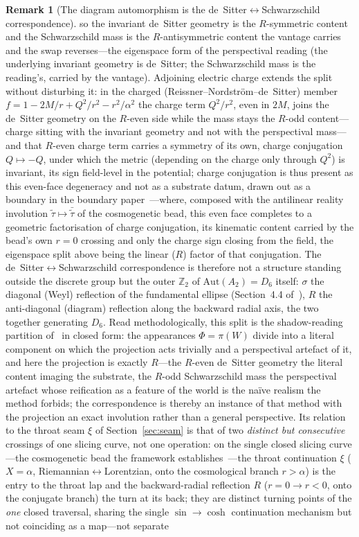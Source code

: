 \documentclass[11pt,a4paper]{article}
\theoremstyle{definition}
\newtheorem{remark}[theorem]{Remark}
\begin{document}
\begin{remark}[The diagram automorphism is the de~Sitter$\leftrightarrow$Schwarzschild correspondence]
so the invariant de~Sitter geometry is the $R$-symmetric content and the Schwarzschild mass is the $R$-antisymmetric content the vantage carries and the swap reverses---the eigenspace form of the perspectival reading (the underlying invariant geometry is de~Sitter; the Schwarzschild mass is the reading's, carried by the vantage). Adjoining electric charge extends the split without disturbing it: in the charged (Reissner--Nordstr\"om--de~Sitter) member $f=1-2M/r+Q^{2}/r^{2}-r^{2}/\alpha^{2}$ the charge term $Q^{2}/r^{2}$, even in $2M$, joins the de~Sitter geometry on the $R$-even side while the mass stays the $R$-odd content---charge sitting with the invariant geometry and not with the perspectival mass---and that $R$-even charge term carries a symmetry of its own, charge conjugation $Q\mapsto-Q$, under which the metric (depending on the charge only through $Q^{2}$) is invariant, its sign field-level in the potential; charge conjugation is thus present as this even-face degeneracy and not as a substrate datum, drawn out as a boundary in the boundary paper~\cite{JanzenBoundary}---where, composed with the antilinear reality involution $\tilde\tau\mapsto\bar{\tilde\tau}$ of the cosmogenetic bead, this even face completes to a geometric factorisation of charge conjugation, its kinematic content carried by the bead's own $r=0$ crossing and only the charge sign closing from the field, the eigenspace split above being the linear ($R$) factor of that conjugation. The de~Sitter$\leftrightarrow$Schwarzschild correspondence is therefore not a structure standing outside the discrete group but the outer $\mathbb{Z}_{2}$ of $\mathrm{Aut}(A_{2})=D_{6}$ itself: $\sigma$ the diagonal (Weyl) reflection of the fundamental ellipse (Section~4.4 of~\cite{JanzenSlicing}), $R$ the anti-diagonal (diagram) reflection along the backward radial axis, the two together generating $D_{6}$. Read methodologically, this split is the shadow-reading partition of~\cite{JanzenShadowExistence} in closed form: the appearances $\Phi=\pi(W)$ divide into a literal component on which the projection acts trivially and a perspectival artefact of it, and here the projection is exactly $R$---the $R$-even de~Sitter geometry the literal content imaging the substrate, the $R$-odd Schwarzschild mass the perspectival artefact whose reification as a feature of the world is the naïve realism the method forbids; the correspondence is thereby an instance of that method with the projection an exact involution rather than a general perspective. Its relation to the throat seam $\xi$ of Section~\ref{sec:seam} is that of two \emph{distinct but consecutive} crossings of one slicing curve, not one operation: on the single closed slicing curve---the cosmogenetic bead the framework establishes~\cite{JanzenCRframework}---the throat continuation $\xi$ ($X=\alpha$, Riemannian$\leftrightarrow$Lorentzian, onto the cosmological branch $r>\alpha$) is the entry to the throat lap and the backward-radial reflection $R$ ($r=0\to r<0$, onto the conjugate branch) the turn at its back; they are distinct turning points of the \emph{one} closed traversal, sharing the single $\sin\to\cosh$ continuation mechanism but not coinciding as a map---not separate 
\end{remark}
\end{document}
